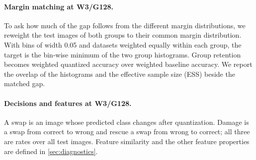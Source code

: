 \paragraph{Margin matching at W3/G128.}
To ask how much of the gap follows from the different margin distributions, we reweight the test images of both groups to their common margin distribution.
With bins of width 0.05 and datasets weighted equally within each group, the target is the bin-wise minimum of the two group histograms.
Group retention becomes weighted quantized accuracy over weighted baseline accuracy.
We report the overlap of the histograms and the effective sample size (ESS) beside the matched gap.

\paragraph{Decisions and features at W3/G128.}
A swap is an image whose predicted class changes after quantization.
Damage is a swap from correct to wrong and rescue a swap from wrong to correct; all three are rates over all test images.
Feature similarity and the other feature properties are defined in \cref{sec:diagnostics}.
